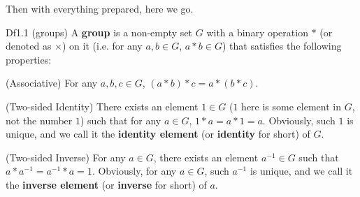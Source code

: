 \documentclass{article}
\begin{document}
Then with everything prepared, here we go. 

\begin{Df}{Df1.1 (groups)}
    A \textbf{group} is a non-empty set $G$ with a binary operation $*$ (or denoted as $\times$) on it (i.e. for any $a, b\in G$, $a*b\in G$) that satisfies the following properties:
    \begin{compactenum}
        \item (Associative) For any $a, b, c\in G$, $(a*b)*c=a*(b*c)$.
        \item (Two-sided Identity) There exists an element $1\in G$ ($1$ here is some element in $G$, not the number $1$) such that for any $a\in G$, $1*a=a*1=a$. \textcolor{Th}{Obviously, such $1$ is unique, } and we call it the \textbf{identity element} (or \textbf{identity} for short) of $G$.
        \item (Two-sided Inverse) For any $a\in G$, there exists an element $a^{-1}\in G$ such that $a*a^{-1}=a^{-1}*a=1$. \textcolor{Th}{Obviously, for any $a\in G$, such $a^{-1}$ is unique, } and we call it the \textbf{inverse element} (or \textbf{inverse} for short) of $a$. 
    \end{compactenum}
\end{Df}
\end{document}

